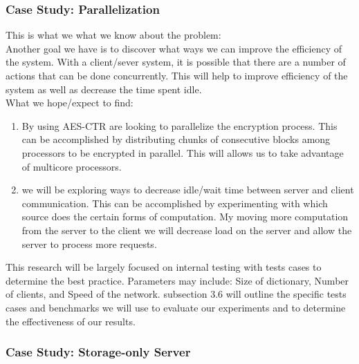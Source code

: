 \subsubsection {Case Study: Parallelization}
\label{subsec:parallel}



This is what we what we know about the problem: \\
Another goal we have is to discover what ways we can improve the efficiency of the system. With a client/sever system, it is possible that there are a number of actions that can be done concurrently. This will help to improve efficiency of the system as well as decrease the time spent idle. \\

What we hope/expect to find:
\begin{enumerate}
\item By using AES-CTR are looking to parallelize the encryption process. This can be accomplished by distributing chunks of consecutive blocks among processors to be encrypted in parallel. This will allows us to take advantage of multi\-core processors.
\item we will be exploring ways to decrease idle/wait time between server and client communication. This can be accomplished by experimenting with which source does the certain forms of computation. My moving more computation from the server to the client we will decrease load on the server and allow the server to process more requests. 
\end{enumerate}

This research will be largely focused on internal testing with tests cases to determine the best practice. Parameters may include: Size of dictionary, Number of clients, and Speed of the network. subsection 3.6 will outline the specific tests cases and benchmarks we will use to evaluate our experiments and to determine the effectiveness of our results. 

\subsubsection {Case Study: Storage-only Server}
\label{subsec:dumbserver}

